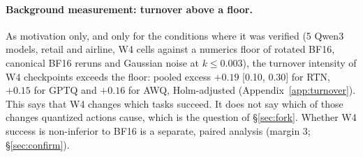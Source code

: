 \begin{table}[t]
\centering\footnotesize\setlength{\tabcolsep}{4pt}
\caption{Agent tool types per domain, from the \tautwo{} tool decorators (commit \texttt{2174a60}), verified by re-derivation from the source. ``Regex misses'': write tools the earlier name-pattern rule failed to classify. Source: \nolinkurl{analysis/insights/iter_4/out/tool_types.json}; full list in Appendix~\ref{app:tooltable}.}
\label{tab:tooltypes}
\end{table}

\paragraph{Background measurement: turnover above a floor.} As motivation only, and only for the conditions where it was verified (5 Qwen3 models, retail and airline, W4 cells against a numerics floor of rotated BF16, canonical BF16 reruns and Gaussian noise at $k\le 0.003$), the turnover intensity of W4 checkpoints exceeds the floor: pooled excess $+0.19$ [0.10, 0.30] for RTN, $+0.15$ for GPTQ and $+0.16$ for AWQ, Holm-adjusted (Appendix~\ref{app:turnover}). This says that W4 changes which tasks succeed. It does not say which of those changes quantized actions cause, which is the question of \S\ref{sec:fork}. Whether W4 success is non-inferior to BF16 is a separate, paired analysis (margin 3\pp{}; \S\ref{sec:confirm}). 
